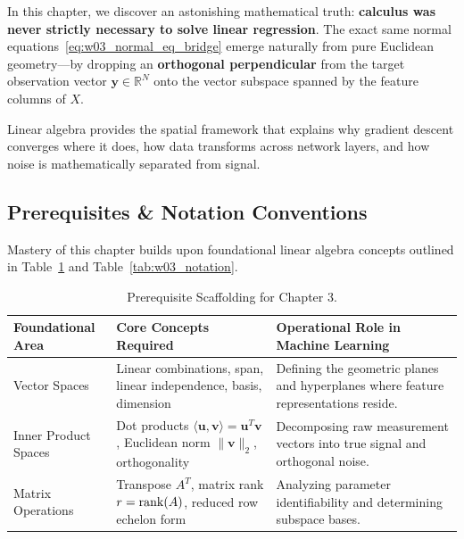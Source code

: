 In this chapter, we discover an astonishing mathematical truth: \textbf{calculus was never strictly necessary to solve linear regression}. The exact same normal equations~\eqref{eq:w03_normal_eq_bridge} emerge naturally from pure Euclidean geometry—by dropping an \textbf{orthogonal perpendicular} from the target observation vector $\mathbf{y} \in \mathbb{R}^N$ onto the vector subspace spanned by the feature columns of $X$. 

Linear algebra provides the spatial framework that explains why gradient descent converges where it does, how data transforms across network layers, and how noise is mathematically separated from signal.

\subsection{Prerequisites \& Notation Conventions}
Mastery of this chapter builds upon foundational linear algebra concepts outlined in Table~\ref{tab:w03_prereqs} and Table~\ref{tab:w03_notation}.

\begin{table}[htbp]
\centering
\small
\begin{tabularx}{\textwidth}{lXX}
\toprule
\textbf{Foundational Area} & \textbf{Core Concepts Required} & \textbf{Operational Role in Machine Learning} \\
\midrule
Vector Spaces & Linear combinations, span, linear independence, basis, dimension & Defining the geometric planes and hyperplanes where feature representations reside. \\
\addlinespace
Inner Product Spaces & Dot products $\langle \mathbf{u}, \mathbf{v} \rangle = \mathbf{u}^T \mathbf{v}$, Euclidean norm $\|\mathbf{v}\|_2$, orthogonality & Decomposing raw measurement vectors into true signal and orthogonal noise. \\
\addlinespace
Matrix Operations & Transpose $A^T$, matrix rank $r = \operatorname{rank}(A)$, reduced row echelon form & Analyzing parameter identifiability and determining subspace bases. \\
\bottomrule
\end{tabularx}
\caption{Prerequisite Scaffolding for Chapter 3.}
\label{tab:w03_prereqs}
\end{table}

